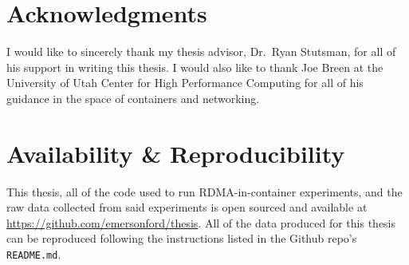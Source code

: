 \documentclass[12pt,titlepage]{article}
\begin{document}
\section{Acknowledgments}
I would like to sincerely thank my thesis advisor, Dr.\ Ryan Stutsman, for all of his support in writing this thesis.
I would also like to thank Joe Breen at the University of Utah Center for High Performance Computing for all of his guidance in the space of containers and networking.

\section{Availability \& Reproducibility}
This thesis, all of the code used to run RDMA-in-container experiments, and the raw data collected from said experiments is open sourced and available at \newline\href{https://github.com/emersonford/thesis}{https://github.com/emersonford/thesis}.
All of the data produced for this thesis can be reproduced following the instructions listed in the Github repo's \texttt{README.md}.

\pagebreak
\printbibliography{}

\end{document}
